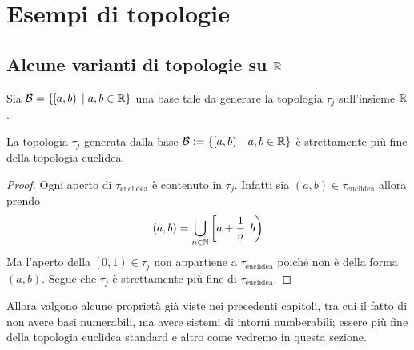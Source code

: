 \chapter{Esempi di topologie}

\section{Alcune varianti di topologie su $\mathbb{R}$}

\begin{definition}
	Sia $\mathcal{B} = \{\left[a,b\right) \; | \; a,b \in \mathbb{R}\}$ una base tale da generare la topologia $\tau_j$ sull'insieme $\mathbb{R}$.
\end{definition}

\begin{theorem}
	La topologia $\tau_j$ generata dalla base $\mathcal{B} := \{ \left[a,b\right) \; | \; a,b\in \mathbb{R} \}$ è strettamente più fine della topologia euclidea. 
\end{theorem}
\begin{proof}
	Ogni aperto di $\tau_{\text{euclidea}}$ è contenuto in $\tau_j$. Infatti sia $(a,b) \in \tau_{\text{euclidea}}$ allora prendo 
	\begin{equation}
	\begin{aligned}
	(a,b) = \bigcup_{n \in \mathbb{N}} \left[a + \frac{1}{n}, b\right)
	\end{aligned}
	\end{equation}
	Ma l'aperto della $\left[0,1\right) \in \tau_j$ non appartiene a $\tau_{\text{euclidea}}$ poiché non è della forma $(a,b)$. Segue che $\tau_j$ è strettamente più fine di $\tau_{\text{euclidea}}$.
\end{proof}

Allora valgono alcune proprietà già viste nei precedenti capitoli, tra cui il fatto di non avere basi numerabili, ma avere sistemi di intorni numberabili; essere più fine della topologia euclidea standard e altro come vedremo in questa sezione.

